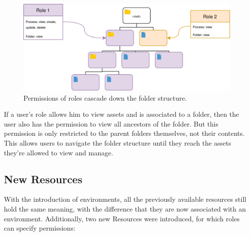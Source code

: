 \begin{figure}[H]
	\centering
	\includegraphics[scale=0.2]{./images/tree-roles.drawio.png}
	\caption{Permissions of roles cascade down the folder structure.}
\end{figure}

If a user's role allows him to view assets and is associated to a folder, then the user
also has the permission to view all ancestors of the folder.
But this permission is only restricted to the parent folders themselves,
not their contents.
This allows users to navigate the folder structure until they reach the assets they're
allowed to view and manage.


\subsection{New Resources}

With the introduction of environments, all the previously available resources still hold
the same meaning, with the difference that they are now associated with an environment.
Additionally, two new Resources were introduced, for which roles can specify permissions:

